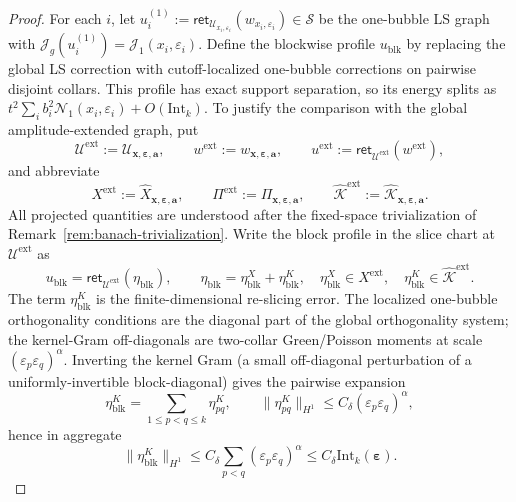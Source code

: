 \documentclass[11pt,reqno,a4paper]{amsart}
\numberwithin{equation}{section}
\theoremstyle{plain}
\theoremstyle{remark}
\theoremstyle{plain}
\begin{document}
\begin{proof}
For each $i$, let
$u_i^{(1)}:=\mathsf{ret}_{\mathcal U_{x_i,\varepsilon_i}}(w_{x_i,\varepsilon_i})\in\mathcal S$
be the one-bubble LS graph with $\mathcal J_g(u_i^{(1)})=\mathcal J_1(x_i,\varepsilon_i)$.
Define the blockwise profile $u_{\mathrm{blk}}$ by replacing the global LS correction
with cutoff-localized one-bubble corrections on pairwise disjoint collars.
This profile has exact support separation, so its energy splits as
$t^2\sum_i b_i^2\mathcal N_1(x_i,\varepsilon_i)+O(\mathrm{Int}_k)$.
\smallskip
\noindent
To justify the comparison with the global amplitude-extended graph, put
\[
\mathcal U^{\mathrm{ext}}
:=\mathcal U_{\mathbf x,\boldsymbol\varepsilon,\mathbf a},
\qquad
w^{\mathrm{ext}}
:=w_{\mathbf x,\boldsymbol\varepsilon,\mathbf a},
\qquad
u^{\mathrm{ext}}
:=\mathsf{ret}_{\mathcal U^{\mathrm{ext}}}(w^{\mathrm{ext}}),
\]
and abbreviate
\[
X^{\mathrm{ext}}
:=\widehat X_{\mathbf x,\boldsymbol\varepsilon,\mathbf a},
\qquad
\Pi^{\mathrm{ext}}
:=\Pi_{\mathbf x,\boldsymbol\varepsilon,\mathbf a},
\qquad
\widehat{\mathcal K}^{\mathrm{ext}}
:=\widehat{\mathcal K}_{\mathbf x,\boldsymbol\varepsilon,\mathbf a}.
\]
All projected quantities are understood after the fixed-space trivialization of
Remark~\ref{rem:banach-trivialization}.  Write the block profile in the slice chart at
$\mathcal U^{\mathrm{ext}}$ as
\[
u_{\mathrm{blk}}
=\mathsf{ret}_{\mathcal U^{\mathrm{ext}}}(\eta_{\mathrm{blk}}),
\qquad
\eta_{\mathrm{blk}}
=\eta_{\mathrm{blk}}^X+\eta_{\mathrm{blk}}^K,
\quad
\eta_{\mathrm{blk}}^X\in X^{\mathrm{ext}},
\quad
\eta_{\mathrm{blk}}^K\in \widehat{\mathcal K}^{\mathrm{ext}}.
\]
The term $\eta_{\mathrm{blk}}^K$ is the finite-dimensional re-slicing error.  The localized
one-bubble orthogonality conditions are the diagonal part of the global orthogonality
system; the kernel-Gram off-diagonals are two-collar Green/Poisson moments at scale
$(\varepsilon_p\varepsilon_q)^\alpha$.  Inverting the kernel Gram (a small off-diagonal
perturbation of a uniformly-invertible block-diagonal) gives the pairwise expansion
\[
\eta_{\mathrm{blk}}^K=\sum_{1\le p<q\le k}\eta_{pq}^K,
\qquad
\|\eta_{pq}^K\|_{H^1}
\le C_\delta(\varepsilon_p\varepsilon_q)^\alpha,
\]
hence in aggregate
\[
\|\eta_{\mathrm{blk}}^K\|_{H^1}
\le C_\delta\sum_{p<q}(\varepsilon_p\varepsilon_q)^\alpha
\le C_\delta\mathrm{Int}_k(\boldsymbol\varepsilon).
\]


\end{proof}
\end{document}
